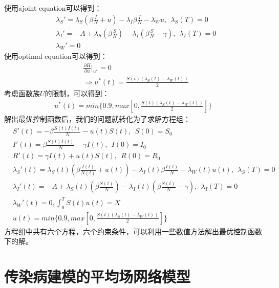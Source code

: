 \documentclass[UTF8]{ctexart}
\begin{document}
		\indent 使用ajoint equation可以得到：
		\begin{equation}
		\begin{aligned}
		&\lambda_{S}'=\lambda_{S}(\beta \frac{I}{N}+u)-\lambda_{I}\beta \frac{I}{N}-\lambda_{W}u,\  \  \lambda_{S}(T)=0 \\
		&\lambda_{I}'=-A+\lambda_{S}(\beta \frac{S}{N})-\lambda_{I}(\beta \frac{S}{N}-\gamma),\  \  \lambda_{I}(T)=0 \\
		&\lambda_{W}'=0
		\end{aligned}
		\end{equation}
		\indent 使用optimal equation可以得到：
		\begin{equation}
		\begin{aligned}
		&\frac{\partial H}{\partial u}\bigg|_{u^*}=0\\
		&\Rightarrow u^*(t)=\frac{S(t)(\lambda_{S}(t)-\lambda_{W}(t))}{2}
		\end{aligned}
		\end{equation}
		\indent 考虑函数族$U$的限制，可以得到：
		\begin{equation}
		\begin{aligned}
		u^*(t)=min\{0.9,max[0,\frac{S(t)(\lambda_{S}(t)-\lambda_{W}(t))}{2}]\}
		\end{aligned}
		\end{equation}
		\indent 解出最优控制函数后，我们的问题就转化为了求解方程组：
		\begin{equation}
		\begin{aligned}
		&S'(t)=-\beta \frac{S(t)I(t)}{N}-u(t)S(t), \ \ S(0)=S_{0}\\
		&I'(t)=\beta \frac{S(t)I(t)}{N}-\gamma I(t),\ \ I(0)=I_{0}\\
		&R'(t)=\gamma I(t)+u(t)S(t),\ \ R(0)=R_{0}\\
		&\lambda_{S}'(t)=\lambda_{S}(t)(\beta \frac{I(t)}{N(t)}+u(t))-\lambda_{I}(t)\beta \frac{I(t)}{N}-\lambda_{W}(t)u(t),\  \  \lambda_{S}(T)=0 \\
		&\lambda_{I}'(t)=-A+\lambda_{S}(t)(\beta \frac{S(t)}{N})-\lambda_{I}(t)(\beta \frac{S(t)}{N}-\gamma),\  \  \lambda_{I}(T)=0 \\
		&\lambda_{W}'(t)=0,\int_{0}^{T}S(t)u(t)=X\\
		&u(t)=min\{0.9,max[0,\frac{S(t)(\lambda_{S}(t)-\lambda_{W}(t))}{2}]\}
		\end{aligned}	
		\end{equation}
		\indent 方程组中共有六个方程，六个约束条件，可以利用一些数值方法解出最优控制函数下的解。
	\section{传染病建模的平均场网络模型}
\end{document}
